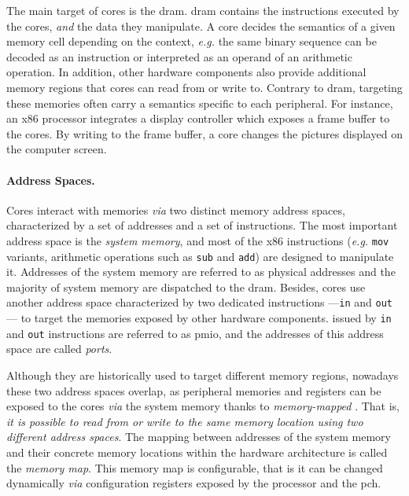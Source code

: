 The main target of cores \IOs is the \ac{dram}.
%
\ac{dram} contains the instructions executed by the cores, \emph{and} the data
they manipulate.
%
A core decides the semantics of a given memory cell depending on the context,
\emph{e.g.}  the same binary sequence can be decoded as an instruction or
interpreted as an operand of an arithmetic operation.
%
In addition, other hardware components also provide additional memory regions
that cores can read from or write to.
%
Contrary to \ac{dram}, \IOs targeting these memories often carry a semantics
specific to each peripheral.
%
For instance, an x86 processor integrates a display controller which exposes a
frame buffer to the cores.
%
By writing to the frame buffer, a core changes the pictures displayed on the
computer screen.

\paragraph{Address Spaces.}
%
Cores interact with memories \emph{via} two distinct memory address spaces,
characterized by a set of addresses and a set of instructions.
%
The most important address space is the \emph{system memory}, and most of the
x86 instructions (\emph{e.g.} \texttt{mov} variants, arithmetic operations
such as \texttt{sub} and \texttt{add}) are designed to manipulate it.
%
Addresses of the system memory are referred to as physical addresses and the
majority of system memory \IOs are dispatched to the \ac{dram}.
%
Besides, cores use another address space characterized by two dedicated
instructions ---\texttt{in} and \texttt{out}--- to target the memories exposed
by other hardware components.
%
\IOs issued by \texttt{in} and \texttt{out} instructions are referred to as
\ac{pmio}, and the addresses of this address space are called \emph{ports}.

Although they are historically used to target different memory regions, nowadays
these two address spaces overlap, as peripheral memories and registers can be
exposed to the cores \emph{via} the system memory thanks to \emph{memory-mapped}
\IOs.
%
That is, \emph{it is possible to read from or write to the same memory location
  using two different address spaces}.
%
%
%
The mapping between addresses of the system memory and their concrete memory
locations within the hardware architecture is called the \emph{memory map}.
%
This memory map is configurable, that is it can be changed dynamically
\emph{via} configuration registers exposed by the processor and the \ac{pch}.

